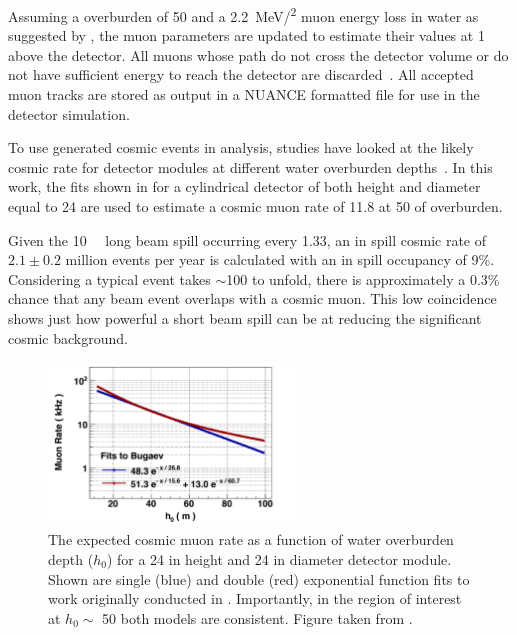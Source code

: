 Assuming a \chipsfive overburden of \SI{50}{} and a \SI{2.2}{\MeV/^{2}} muon
energy loss in water as suggested by , the muon parameters are updated
to estimate their values at \SI{1}{} above the detector. All muons whose path do not cross
the detector volume or do not have sufficient energy to reach the detector are
discarded~\cite{chipsgen2020}. All accepted muon tracks are stored as output in a NUANCE formatted
file for use in the detector simulation.

To use generated cosmic events in analysis, studies have looked at the likely cosmic rate for
\chips detector modules at different water overburden depths~\cite{son2013}. In this work, the
fits shown in  for a cylindrical detector of both height and diameter
equal to \SI{24}{} are used to estimate a \chipsfive cosmic muon rate of
\SI{11.8}{} at \SI{50}{} of overburden.

Given the \SI{10}{\micro{}} long \numi beam spill occurring every \SI{1.33}{},
an in spill cosmic rate of $2.1\pm0.2$ million events per year is calculated with an in spill
occupancy of 9\%. Considering a typical event takes $\sim$\SI{100}{} to unfold, there is
approximately a 0.3\% chance that any beam event overlaps with a cosmic muon. This low coincidence
shows just how powerful a short beam spill can be at reducing the significant cosmic background.

\begin{figure} %
    \includegraphics[width=0.6\textwidth]{diagrams/4-chips/cosmic_rate.pdf}
    \caption[Expected \chipsfive cosmic muon rate as a function of water overburden depth]
    {The expected cosmic muon rate as a function of water overburden depth ($h_0$) for a
    \SI{24}{} in height and \SI{24}{} in diameter \chips detector module. Shown
    are single (blue) and double (red) exponential function fits to work originally conducted in
    . Importantly, in the region of interest at $h_{0}\sim$
    \SI{50}{} both models are consistent. Figure taken from .}
    \label{fig:cosmic_rate}
\end{figure}